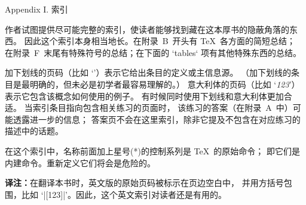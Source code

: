 


\beginappendix Appendix I. 索引

\maxdepth=4pt
作者试图提供尽可能完整的索引，使读者能够找到藏在这本厚书的隐蔽角落的东西。
因此这个索引本身相当地长。在附录~B~开头有 \TeX\ 各方面的简短总结；
在附录~F~末尾有特殊符号的总结；在下面的 `tables` 项有其他特殊东西的总结。

\medskip\ninepoint
加下划线的页码（比如 `’）表示它给出条目的定义或主信息源。%
（加下划线的条目是最明确的，但未必是初学者最容易理解的。）%
意大利体的页码（比如 `{\it123\/}'）表示它包含该概念如何使用的例子。
有时候同时使用下划线和意大利体更加合适。
当索引条目指向包含相关练习的页面时，
该练习的答案（在附录~A~中）可能透露进一步的信息；
答案页不会在这里索引，除非它提及不包含在对应练习的描述中的话题。

\smallskip
在这个索引中，名称前面加上星号(*)的控制系列是 \TeX\ 的原始命令；
即它们是内建命令。重新定义它们将会是危险的。

\smallskip
{\bf 译注：}在翻译本书时，英文版的原始页码被标示在页边空白中，
并用方括号包围，比如 `|[123]|'。因此，这个英文索引对读者还是有用的。

